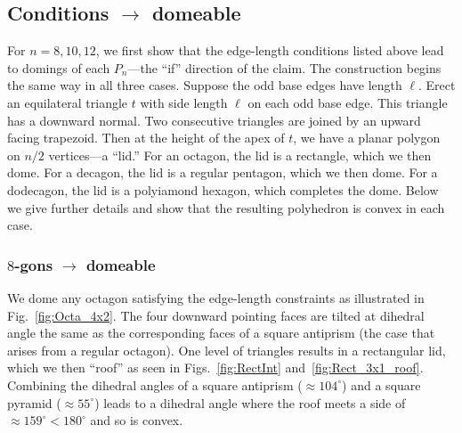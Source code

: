 \documentclass[11pt]{article}
\newcommand{\figref}[1]{\ref{fig:#1}}
\newcommand{\Anna}[1]{{\color{red} Anna: [#1]}}
\newcommand{\anna}[1]{{\color{blue} #1}}
\begin{document}
\subsection{Conditions $\to$ domeable} %
For $n=8,10,12$, we first show that the edge-length conditions listed above
lead to domings of each $P_n$---the ``if'' direction of the claim.
The construction begins the same way in all three cases.
Suppose the odd base edges have length $\ell$.  Erect an equilateral triangle $t$ with side length $\ell$ on each odd base edge.
%
This triangle has a downward normal.
Two consecutive triangles are joined by
an upward facing trapezoid.
Then at the height of the apex of $t$,
we have a planar polygon on $n/2$ vertices---a ``lid.''
For an octagon, 
the %
lid is a rectangle, which we then dome.
For a decagon,
the %
lid is a regular pentagon, which we then dome.
For a dodecagon,
the %
lid is a polyiamond hexagon, which completes the dome. 
Below we give further details and show that the resulting polyhedron is convex in each case.

\subsubsection{$8$-gons $\to$ domeable}
We dome any octagon satisfying the edge-length constraints as illustrated
in Fig.~\figref{Octa_4x2}. The four downward pointing faces are tilted at
dihedral angle the same
as the corresponding faces of a square antiprism 
(the case that arises from a regular octagon).
One level of triangles results in a rectangular \anna{lid},
which we then ``roof'' as 
seen in Figs.~\figref{RectInt} and~\figref{Rect_3x1_roof}.
Combining the dihedral angles of a square antiprism
($\approx 104^\circ$) and a square pyramid
($\approx 55^\circ$)
leads to a dihedral angle where the roof meets a
side of $\approx 159^\circ < 180^\circ$ and so is convex.
\end{document}
